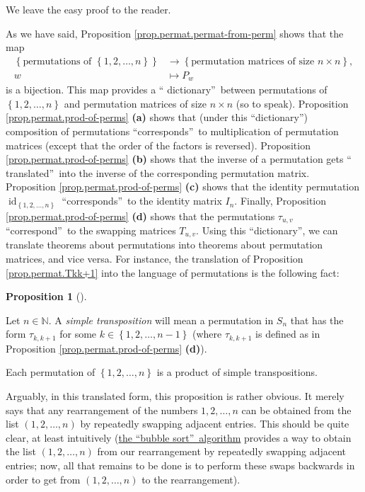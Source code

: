 \documentclass[numbers=enddot,12pt,final,onecolumn,notitlepage]{scrartcl}%
\theoremstyle{definition}
\newtheorem{prop}[theo]{Proposition}
\newenvironment{proposition}[1][]
{\begin{prop}[#1]\begin{leftbar}}
{\end{leftbar}\end{prop}}
\begin{document}
We leave the easy proof to the reader.

As we have said, Proposition \ref{prop.permat.permat-from-perm} shows that the
map%
\begin{align*}
\left\{  \text{permutations of }\left\{  1,2,\ldots,n\right\}  \right\}   &
\rightarrow\left\{  \text{permutation matrices of size }n\times n\right\}  ,\\
w  &  \mapsto P_{w}%
\end{align*}
is a bijection. This map provides a \textquotedblleft
dictionary\textquotedblright\ between permutations of $\left\{  1,2,\ldots
,n\right\}  $ and permutation matrices of size $n\times n$ (so to speak).
Proposition \ref{prop.permat.prod-of-perms} \textbf{(a)} shows that (under
this \textquotedblleft dictionary\textquotedblright) composition of
permutations \textquotedblleft corresponds\textquotedblright\ to
multiplication of permutation matrices (except that the order of the factors
is reversed). Proposition \ref{prop.permat.prod-of-perms} \textbf{(b)} shows
that the inverse of a permutation gets \textquotedblleft
translated\textquotedblright\ into the inverse of the corresponding
permutation matrix. Proposition \ref{prop.permat.prod-of-perms} \textbf{(c)}
shows that the identity permutation $\operatorname*{id}\nolimits_{\left\{
1,2,\ldots,n\right\}  }$ \textquotedblleft corresponds\textquotedblright\ to
the identity matrix $I_{n}$. Finally, Proposition
\ref{prop.permat.prod-of-perms} \textbf{(d)} shows that the permutations
$\tau_{u,v}$ \textquotedblleft correspond\textquotedblright\ to the swapping
matrices $T_{u,v}$. Using this \textquotedblleft dictionary\textquotedblright,
we can translate theorems about permutations into theorems about permutation
matrices, and vice versa. For instance, the translation of Proposition
\ref{prop.permat.Tkk+1} into the language of permutations is the following fact:

\begin{proposition}
\label{prop.permat.Tkk+1.perm}Let $n\in\mathbb{N}$. A \textit{simple
transposition} will mean a permutation in $S_{n}$ that has the form
$\tau_{k,k+1}$ for some $k\in\left\{  1,2,\ldots,n-1\right\}  $ (where
$\tau_{k,k+1}$ is defined as in Proposition \ref{prop.permat.prod-of-perms}
\textbf{(d)}).

Each permutation of $\left\{  1,2,\ldots,n\right\}  $ is a product of simple transpositions.
\end{proposition}

Arguably, in this translated form, this proposition is rather obvious. It
merely says that any rearrangement of the numbers $1,2,\ldots,n$ can be
obtained from the list $\left(  1,2,\ldots,n\right)  $ by repeatedly swapping
adjacent entries. This should be quite clear, at least intuitively
(\href{https://en.wikipedia.org/wiki/Bubble_sort}{the \textquotedblleft bubble
sort\textquotedblright\ algorithm} provides a way to obtain the list $\left(
1,2,\ldots,n\right)  $ from our rearrangement by repeatedly swapping adjacent
entries; now, all that remains to be done is to perform these swaps backwards
in order to get from $\left(  1,2,\ldots,n\right)  $ to the rearrangement).
\end{document}
